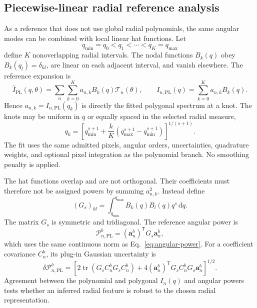 \documentclass[aps,prb,preprint,onecolumn,notitlepage,amsmath,amssymb,
  superscriptaddress,floatfix]{revtex4-2}
\newcommand{\dd}{\,\mathrm{d}}
\newcommand{\trans}{\mathsf{T}}
\newcommand{\tr}{\operatorname{tr}}
\begin{document}
\subsection{Piecewise-linear radial reference analysis}

As a reference that does not use global radial polynomials, the same angular
modes can be combined with local linear hat functions. Let
\begin{equation}
 q_{\min}=q_0<q_1<\cdots<q_K=q_{\max}
\end{equation}
define $K$ nonoverlapping radial intervals. The nodal functions $B_k(q)$ obey
$B_k(q_l)=\delta_{kl}$, are linear on each adjacent interval, and vanish
elsewhere. The reference expansion is
\begin{equation}
 \widehat I_{\mathrm{PL}}(q,\theta)
 =\sum_n\sum_{k=0}^{K}a_{n,k}B_k(q)\mathcal{T}_n(\theta),
 \qquad
 I_{n,\mathrm{PL}}(q)=\sum_{k=0}^{K}a_{n,k}B_k(q).
 \label{eq:piecewise-expansion}
\end{equation}
Hence $a_{n,k}=I_{n,\mathrm{PL}}(q_k)$ is directly the fitted polygonal
spectrum at a knot. The knots may be uniform in $q$ or equally spaced in the
selected radial measure,
\begin{equation}
 q_k=\left[q_{\min}^{s+1}
 +\frac{k}{K}\left(q_{\max}^{s+1}-q_{\min}^{s+1}\right)\right]^{1/(s+1)}.
 \label{eq:piecewise-knots}
\end{equation}
The fit uses the same admitted pixels, angular orders, uncertainties,
quadrature weights, and optional pixel integration as the polynomial branch.
No smoothing penalty is applied.

The hat functions overlap and are not orthogonal. Their coefficients must
therefore not be assigned powers by summing $a_{n,k}^2$. Instead define
\begin{equation}
 (G_s)_{kl}=\int_{q_{\min}}^{q_{\max}}B_k(q)B_l(q)q^s\dd q.
 \label{eq:piecewise-gram}
\end{equation}
The matrix $G_s$ is symmetric and tridiagonal. The reference angular power is
\begin{equation}
 \mathcal{P}_{n,\mathrm{PL}}^b
 =(\bm a_n^b)^{\trans}G_s\bm a_n^b,
 \label{eq:piecewise-power}
\end{equation}
which uses the same continuous norm as Eq.~\eqref{eq:angular-power}. For a
coefficient covariance $C_n^b$, its plug-in Gaussian uncertainty is
\begin{equation}
 \delta\mathcal{P}_{n,\mathrm{PL}}^b
 =\left[
 2\tr(G_sC_n^bG_sC_n^b)
 +4(\bm a_n^b)^{\trans}G_sC_n^bG_s\bm a_n^b
 \right]^{1/2}.
 \label{eq:piecewise-power-error}
\end{equation}
Agreement between the polynomial and polygonal $I_n(q)$ and angular powers
tests whether an inferred radial feature is robust to the chosen radial
representation.
\end{document}
